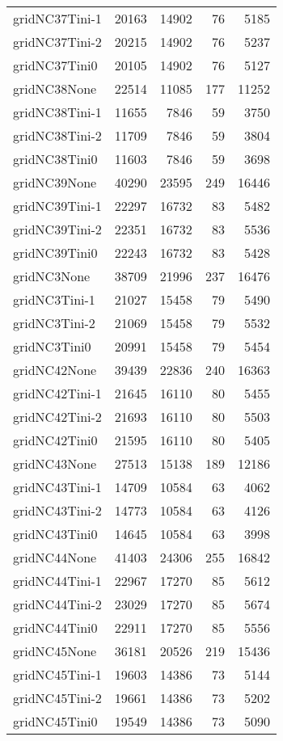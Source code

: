 \begin{longtable}{lrrrr}
gridNC37Tini-1 & 20163 & 14902 & 76 & 5185 \\
gridNC37Tini-2 & 20215 & 14902 & 76 & 5237 \\
gridNC37Tini0 & 20105 & 14902 & 76 & 5127 \\
gridNC38None & 22514 & 11085 & 177 & 11252 \\
gridNC38Tini-1 & 11655 & 7846 & 59 & 3750 \\
gridNC38Tini-2 & 11709 & 7846 & 59 & 3804 \\
gridNC38Tini0 & 11603 & 7846 & 59 & 3698 \\
gridNC39None & 40290 & 23595 & 249 & 16446 \\
gridNC39Tini-1 & 22297 & 16732 & 83 & 5482 \\
gridNC39Tini-2 & 22351 & 16732 & 83 & 5536 \\
gridNC39Tini0 & 22243 & 16732 & 83 & 5428 \\
gridNC3None & 38709 & 21996 & 237 & 16476 \\
gridNC3Tini-1 & 21027 & 15458 & 79 & 5490 \\
gridNC3Tini-2 & 21069 & 15458 & 79 & 5532 \\
gridNC3Tini0 & 20991 & 15458 & 79 & 5454 \\
gridNC42None & 39439 & 22836 & 240 & 16363 \\
gridNC42Tini-1 & 21645 & 16110 & 80 & 5455 \\
gridNC42Tini-2 & 21693 & 16110 & 80 & 5503 \\
gridNC42Tini0 & 21595 & 16110 & 80 & 5405 \\
gridNC43None & 27513 & 15138 & 189 & 12186 \\
gridNC43Tini-1 & 14709 & 10584 & 63 & 4062 \\
gridNC43Tini-2 & 14773 & 10584 & 63 & 4126 \\
gridNC43Tini0 & 14645 & 10584 & 63 & 3998 \\
gridNC44None & 41403 & 24306 & 255 & 16842 \\
gridNC44Tini-1 & 22967 & 17270 & 85 & 5612 \\
gridNC44Tini-2 & 23029 & 17270 & 85 & 5674 \\
gridNC44Tini0 & 22911 & 17270 & 85 & 5556 \\
gridNC45None & 36181 & 20526 & 219 & 15436 \\
gridNC45Tini-1 & 19603 & 14386 & 73 & 5144 \\
gridNC45Tini-2 & 19661 & 14386 & 73 & 5202 \\
gridNC45Tini0 & 19549 & 14386 & 73 & 5090 \\

\end{longtable}
